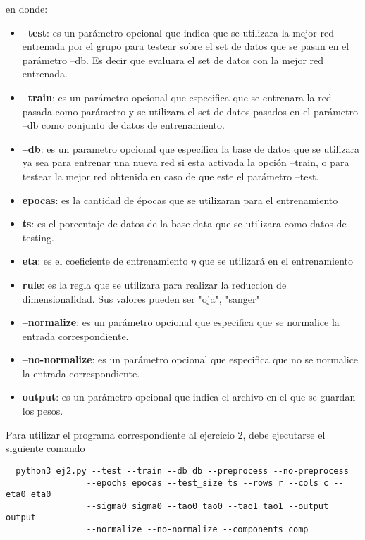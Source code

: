 en donde:
\begin{itemize}
  \item \textbf{--test}: es un parámetro opcional que indica que se utilizara la mejor red entrenada por el grupo para testear sobre el set de datos que se pasan en el parámetro
  --db. Es decir que evaluara el set de datos con la mejor red entrenada.
  \item \textbf{--train}: es un parámetro opcional que especifica que se entrenara la red pasada como parámetro y se utilizara el set de datos pasados en el parámetro --db
  como conjunto de datos de entrenamiento.
  \item \textbf{--db}: es un parametro opcional que especifica la base de datos que se utilizara ya sea para entrenar una nueva red si esta activada la opción --train, o
  para testear la mejor red obtenida en caso de que este el parámetro --test.
  \item \textbf{epocas}: es la cantidad de épocas que se utilizaran para el entrenamiento
  \item \textbf{ts}: es el porcentaje de datos de la base data que se utilizara como datos de testing.
  \item \textbf{eta}: es el coeficiente de entrenamiento $\eta$ que se utilizará en el entrenamiento
  \item \textbf{rule}: es la regla que se utilizara para realizar la reduccion de dimensionalidad. Sus valores pueden ser {"oja", "sanger"}
  \item \textbf{--normalize}: es un parámetro opcional que especifica que se normalice la entrada correspondiente.
  \item \textbf{--no-normalize}: es un parámetro opcional que especifica que no se normalice la entrada correspondiente.
  \item \textbf{output}: es un parámetro opcional que indica el archivo en el que se guardan los pesos.
\end{itemize}

Para utilizar el programa correspondiente al ejercicio 2, debe ejecutarse el siguiente comando
\begin{verbatim}
  python3 ej2.py --test --train --db db --preprocess --no-preprocess
                --epochs epocas --test_size ts --rows r --cols c --eta0 eta0
                --sigma0 sigma0 --tao0 tao0 --tao1 tao1 --output output
                --normalize --no-normalize --components comp
\end{verbatim}


